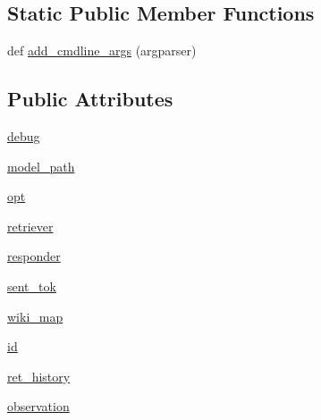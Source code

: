 \subsection*{Static Public Member Functions}
\begin{DoxyCompactItemize}
\item 
def \hyperlink{classprojects_1_1wizard__of__wikipedia_1_1interactive__end2end_1_1interactive__end2end_1_1InteractiveEnd2endAgent_a9b5b190ee1b45a7be03540894569ad5d}{add\+\_\+cmdline\+\_\+args} (argparser)
\end{DoxyCompactItemize}
\subsection*{Public Attributes}
\begin{DoxyCompactItemize}
\item 
\hyperlink{classprojects_1_1wizard__of__wikipedia_1_1interactive__end2end_1_1interactive__end2end_1_1InteractiveEnd2endAgent_a556dc551a208cc518f9cff1bd8a8e2e4}{debug}
\item 
\hyperlink{classprojects_1_1wizard__of__wikipedia_1_1interactive__end2end_1_1interactive__end2end_1_1InteractiveEnd2endAgent_a31cdaf3d89ed7a2e317e6537b39e4878}{model\+\_\+path}
\item 
\hyperlink{classprojects_1_1wizard__of__wikipedia_1_1interactive__end2end_1_1interactive__end2end_1_1InteractiveEnd2endAgent_a8648998ff7bde9b081fd6fa56ee6c9ae}{opt}
\item 
\hyperlink{classprojects_1_1wizard__of__wikipedia_1_1interactive__end2end_1_1interactive__end2end_1_1InteractiveEnd2endAgent_abb1fb67249f65cb6e038a9e8a3355e45}{retriever}
\item 
\hyperlink{classprojects_1_1wizard__of__wikipedia_1_1interactive__end2end_1_1interactive__end2end_1_1InteractiveEnd2endAgent_ad789e05d846f3be28524404550aa8a0c}{responder}
\item 
\hyperlink{classprojects_1_1wizard__of__wikipedia_1_1interactive__end2end_1_1interactive__end2end_1_1InteractiveEnd2endAgent_a9c8042c55c107e251e2501d4e7e609f0}{sent\+\_\+tok}
\item 
\hyperlink{classprojects_1_1wizard__of__wikipedia_1_1interactive__end2end_1_1interactive__end2end_1_1InteractiveEnd2endAgent_a533c75ced6f6bd88159c8f6cc6d0fd31}{wiki\+\_\+map}
\item 
\hyperlink{classprojects_1_1wizard__of__wikipedia_1_1interactive__end2end_1_1interactive__end2end_1_1InteractiveEnd2endAgent_a8719d928321250617293e8e824b33d7b}{id}
\item 
\hyperlink{classprojects_1_1wizard__of__wikipedia_1_1interactive__end2end_1_1interactive__end2end_1_1InteractiveEnd2endAgent_a53f0d295f548f8a11be75b3030234e92}{ret\+\_\+history}
\item 
\hyperlink{classprojects_1_1wizard__of__wikipedia_1_1interactive__end2end_1_1interactive__end2end_1_1InteractiveEnd2endAgent_af812e584ad08b9cc39ba590aa840280d}{observation}
\end{DoxyCompactItemize}


